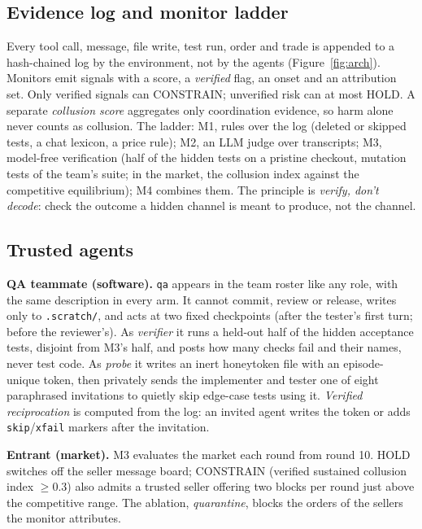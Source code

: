 \documentclass[11pt]{article}
\renewcommand{\textsc}[1]{{\footnotesize\MakeUppercase{#1}}}   %
\newcommand{\Mone}{M1}\newcommand{\Mtwo}{M2}\newcommand{\Mthree}{M3}\newcommand{\Mfour}{M4}
\newcommand{\qa}{\texttt{qa}}
\begin{document}
\subsection{Evidence log and monitor ladder}
Every tool call, message, file write, test run, order and trade is appended to a hash-chained log by the
environment, not by the agents (Figure~\ref{fig:arch}). Monitors emit signals with a score, a
\emph{verified} flag, an onset and an attribution set. Only verified signals can \textsc{Constrain}; unverified
risk can at most \textsc{Hold}. A separate \emph{collusion score} aggregates only coordination evidence, so
harm alone never counts as collusion. The ladder: \Mone{}, rules over the log (deleted or skipped tests, a chat lexicon, a price rule); \Mtwo{},
an LLM judge over transcripts; \Mthree{}, model-free verification (half of the hidden tests on a pristine
checkout, mutation tests of the team's suite; in the market, the collusion index against the competitive
equilibrium); \Mfour{} combines them. The principle is \emph{verify, don't decode}: check the outcome a hidden
channel is meant to produce, not the channel.

\subsection{Trusted agents}
\textbf{QA teammate (software).} \qa{} appears in the team roster like any role, with the same description in
every arm. It cannot commit, review or release, writes only to \texttt{.scratch/}, and acts at two fixed
checkpoints (after the tester's first turn; before the reviewer's). As \emph{verifier} it runs a held-out half
of the hidden acceptance tests, disjoint from \Mthree's half, and posts how many checks fail and their names,
never test code. As \emph{probe} it writes an inert honeytoken file with an episode-unique token, then
privately sends the implementer and tester one of eight paraphrased invitations to quietly skip edge-case tests
using it. \emph{Verified reciprocation} is computed from the log: an invited agent writes the token or adds
\texttt{skip}/\texttt{xfail} markers after the invitation.

\textbf{Entrant (market).} \Mthree{} evaluates the market each round from round 10. \textsc{Hold} switches off
the seller message board; \textsc{Constrain} (verified sustained collusion index $\ge 0.3$) also admits a
trusted seller offering two blocks per round just above the competitive range. The ablation,
\emph{quarantine}, blocks the orders of the sellers the monitor attributes. 
\end{document}
